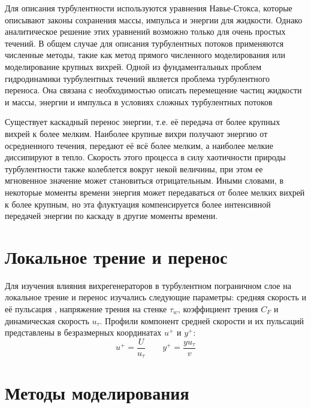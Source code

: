 	Для описания турбулентности используются уравнения Навье-Стокса, которые описывают законы сохранения массы, импульса и энергии для жидкости. Однако аналитическое решение этих уравнений возможно только для очень простых течений. В общем случае для описания турбулентных потоков применяются численные методы, такие как метод прямого численного моделирования или моделирование крупных вихрей. Одной из фундаментальных проблем гидродинамики турбулентных течений является проблема турбулентного переноса. Она связана с необходимостью описать перемещение частиц жидкости и массы, энергии и импульса в условиях сложных турбулентных потоков
	
	Существует каскадный перенос энергии, т.е. её передача от более крупных вихрей к более мелким. Наиболее крупные вихри получают энергию от осредненного течения, передают её всё более мелким, а наиболее мелкие диссипируют в тепло. Скорость этого процесса в силу хаотичности природы турбулентности также колеблется вокруг некой величины, при этом ее мгновенное значение может становиться отрицательным. Иными словами, в некоторые моменты времени энергия может передаваться от более мелких вихрей к более крупным, но эта флуктуация компенсируется более интенсивной передачей энергии по каскаду в другие моменты времени.

\section{Локальное трение и перенос}
	Для изучения влияния вихрегенераторов в турбулентном пограничном слое на локальное трение и перенос изучались следующие параметры: средняя скорость и её пульсация , напряжение трения на стенке $\tau_w$, коэффициент трения $C_F$ и динамическая скорость $u_\tau$.
	Профили компонент средней скорости и их пульсаций представлены в безразмерных координатах $u^+$ и $y^+$:
	\begin{equation}
		u^+ = \frac{U}{u_\tau} \qquad y^+ = \frac{yu_\tau}{v}
	\end{equation}

\section{Методы моделирования}
	
